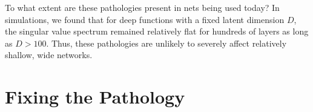 To what extent are these pathologies present in nets being used today?  In simulations, we found that for deep functions with a fixed latent dimension $D$, the singular value spectrum remained relatively flat for hundreds of layers as long as $D > 100$.  Thus, these pathologies are unlikely to severely affect relatively shallow, wide networks.






\section{Fixing the Pathology}
\label{sec:fix}


